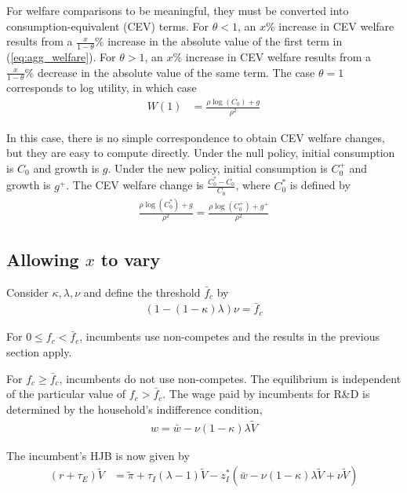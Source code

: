\documentclass[12pt,english]{article}
\theoremstyle{remark}
\begin{document}
For welfare comparisons to be meaningful, they must be converted into consumption-equivalent (CEV) terms. For $\theta < 1$, an $x\%$ increase in CEV welfare results from a $\frac{x}{1-\theta}\%$ increase in the absolute value of the first term in (\ref{eq:agg_welfare}). For $\theta > 1$, an $x\%$ increase in CEV welfare results from a $\frac{x}{1-\theta}\%$ decrease in the absolute value of the same term. The case $\theta = 1$ corresponds to log utility, in which case
\begin{align}
	W(1) &= \frac{\rho \log(C_0) + g}{\rho^2} \label{eq:agg_welfare_log}
\end{align}

In this case, there is no simple correspondence to obtain CEV welfare changes, but they are easy to compute directly. Under the null policy, initial consumption is $C_0$ and growth is $g$. Under the new policy, initial consumption is $C_0^+$ and growth is $g^+$. The CEV welfare change is $\frac{C_0^* - C_0}{C_0}$, where $C_0^*$ is defined by 
\begin{align}
	\frac{\rho\log(C_0^*) + g}{\rho^2} = \frac{\rho \log(C_0^+) + g^+}{\rho^2} \label{eq:agg_welfare_log_CEV}
\end{align}

\subsection{Allowing $x$ to vary}

Consider $\kappa, \lambda, \nu$ and define the threshold $\bar{f}_c$ by 
\begin{align}
	(1-(1-\kappa)\lambda)\nu = \bar{f}_c
\end{align}

For $0 \le f_c < \bar{f}_c$, incumbents use non-competes and the results in the previous section apply.

For $f_c \ge \bar{f}_c$, incumbents do not use non-competes. The equilibrium is independent of the particular value of $f_c > \bar{f}_c$. The wage paid by incumbents for R\&D is determined by the household's indifference condition,
\begin{align}
	w = \bar{w} - \nu (1-\kappa) \lambda \tilde{V} \label{eq:wage_rd}
\end{align}

The incumbent's HJB is now given by 
\begin{align}
	(r + \tau_E) \tilde{V} &= \tilde{\pi} + \tau_I (\lambda - 1) \tilde{V} - z^*_I(\bar{w} - \nu (1-\kappa) \lambda \tilde{V} + \nu \tilde{V} ) \label{eq:hjb_incumbent_noNCA}
\end{align}
\end{document}
